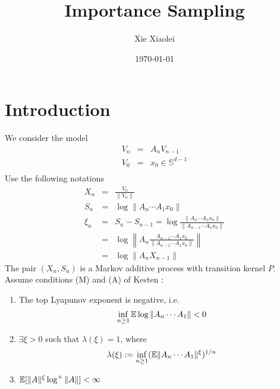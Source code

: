 \documentclass{article}
\title{Importance Sampling}
\author{Xie Xiaolei}
\date{\today}
\begin{document}
\maketitle
\section{Introduction}
We consider the model
\begin{eqnarray*}
V_n &=& A_n V_{n-1} \\
V_0 &=& x_0 \in \mathbb S^{d-1}\\
\end{eqnarray*}
Use the following notations
\begin{eqnarray*}
X_n &=& \frac{V_n}{\|V_n\|} \\
S_n &=& \log \|A_n \cdots A_1 x_0\| \\
\xi_n &=& S_n - S_{n-1} = \log\frac{\|A_n \cdots A_1 x_0\|}{\|A_{n-1}
  \cdots A_1 x_0\|} \\
&=& \log\left\| A_n \frac{A_{n-1} \cdots A_1 x_0}{\|A_{n-1} \cdots A_1
    x_0\|} \right\|\\
&=& \log \|A_n X_{n-1}\|
\end{eqnarray*}
The pair $(X_n, S_n)$ is a Markov additive process with transition
kernel $P$. Assume conditions (M) and (A) of Kesten \cite{Kesten1973}:
\begin{enumerate}
\item The top Lyapunov exponent is negative, i.e.
  \begin{equation}
    \label{eq:neg_top_Lyapunov}
    \inf_{n \geq 1} \mathbb{E} \log \|A_n \cdots A_1\| < 0    
  \end{equation}
\item $\exists \xi > 0$ such that $\lambda(\xi) = 1$, where
  $$
  \lambda(\xi) := \inf_{n \geq 1} (\mathbb{E} \|A_n \cdots A_1\|^\xi)^{1/n}
  $$
\item $\mathbb{E}[\|A\|^\xi \log^+\|A\|] < \infty$
\end{enumerate}
\end{document}
